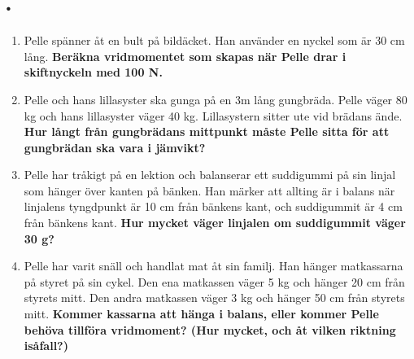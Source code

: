 \documentclass[11pt]{article}
\begin{document}
\raggedright


\section*{\lessonNumber. \lessonName}
\begin{enumerate}[itemsep=2em]
        \item
              \begin{minipage}[t]{0.5\textwidth}
                      Pelle spänner åt en bult på bildäcket. Han använder en nyckel som är 30 cm lång. \textbf{Beräkna vridmomentet som skapas när Pelle drar i skiftnyckeln med 100 N.}
              \end{minipage}
              \hfill
              \begin{adjustbox}{valign=t}
                      
              \end{adjustbox}
        \item
              Pelle och hans lillasyster ska gunga på en 3m lång gungbräda. Pelle väger 80 kg och hans lillasyster väger 40 kg. Lillasystern sitter ute vid brädans ände. \textbf{Hur långt från gungbrädans mittpunkt måste Pelle sitta för att gungbrädan ska vara i jämvikt?}
              \begin{center}
                      
              \end{center}

        \item
              Pelle har tråkigt på en lektion och balanserar ett suddigummi på sin linjal som hänger över kanten på bänken. Han märker att allting är i balans när linjalens tyngdpunkt är 10 cm från bänkens kant, och suddigummit är 4 cm från bänkens kant. \textbf{Hur mycket väger linjalen om suddigummit väger 30 g?}
              \begin{center}
                      
              \end{center}

        \item
              \begin{minipage}[t]{0.5\textwidth}
                      Pelle har varit snäll och handlat mat åt sin familj. Han hänger matkassarna på styret på sin cykel. Den ena matkassen väger 5 kg och hänger 20 cm från styrets mitt. Den andra matkassen väger 3 kg och hänger 50 cm från styrets mitt. \textbf{Kommer kassarna att hänga i balans, eller kommer Pelle behöva tillföra vridmoment? (Hur mycket, och åt vilken riktning isåfall?)}
              \end{minipage}
              \hfill
              \begin{adjustbox}{valign=t}
                      
              \end{adjustbox}


\end{enumerate}
\end{document}
